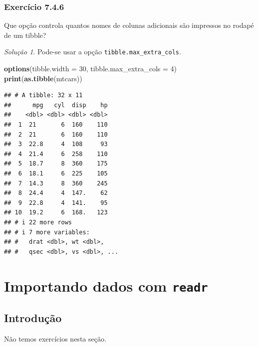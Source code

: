 \documentclass[
]{latex/krantz}
\newenvironment{Shaded}{\begin{snugshade}}{\end{snugshade}}
\newcommand{\AttributeTok}[1]{\textcolor[rgb]{0.13,0.29,0.53}{#1}}
\newcommand{\DecValTok}[1]{\textcolor[rgb]{0.00,0.00,0.81}{#1}}
\newcommand{\FunctionTok}[1]{\textcolor[rgb]{0.13,0.29,0.53}{\textbf{#1}}}
\newcommand{\NormalTok}[1]{#1}
\theoremstyle{definition}
\theoremstyle{definition}
\theoremstyle{definition}
\theoremstyle{definition}
\theoremstyle{remark}
\newtheorem*{solution}{Solução}
\begin{document}
\hypertarget{exr7-4-6}{%
\subsection*{Exercício 7.4.6}\label{exr7-4-6}}

Que opção controla quantos nomes de colunas adicionais são impressos no rodapé de um tibble?

\begin{solution}

Pode-se usar a opção \texttt{tibble.max\_extra\_cols}.

\begin{Shaded}
\begin{Highlighting}[]
\FunctionTok{options}\NormalTok{(}\AttributeTok{tibble.width =} \DecValTok{30}\NormalTok{, }\AttributeTok{tibble.max\_extra\_cols =} \DecValTok{4}\NormalTok{)}
\FunctionTok{print}\NormalTok{(}\FunctionTok{as.tibble}\NormalTok{(mtcars))}
\end{Highlighting}
\end{Shaded}

\begin{verbatim}
## # A tibble: 32 x 11
##      mpg   cyl  disp    hp
##    <dbl> <dbl> <dbl> <dbl>
##  1  21       6  160    110
##  2  21       6  160    110
##  3  22.8     4  108     93
##  4  21.4     6  258    110
##  5  18.7     8  360    175
##  6  18.1     6  225    105
##  7  14.3     8  360    245
##  8  24.4     4  147.    62
##  9  22.8     4  141.    95
## 10  19.2     6  168.   123
## # i 22 more rows
## # i 7 more variables:
## #   drat <dbl>, wt <dbl>,
## #   qsec <dbl>, vs <dbl>, ...
\end{verbatim}

\end{solution}

\hypertarget{importando-dados-com-readr}{%
\chapter{\texorpdfstring{Importando dados com \texttt{readr}}{Importando dados com readr}}\label{importando-dados-com-readr}}

\hypertarget{introduuxe7uxe3o-4}{%
\section{Introdução}\label{introduuxe7uxe3o-4}}

Não temos exercícios nesta seção.
\end{document}
